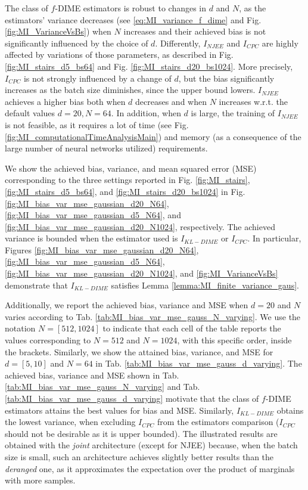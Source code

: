 The class of $f$-DIME estimators is robust to changes in $d$ and $N$, as the estimators' variance decreases (see \eqref{eq:MI_variance_f_dime} and Fig. \ref{fig:MI_VarianceVsBs}) when $N$ increases and their achieved bias is not significantly influenced by the choice of $d$. Differently, $I_{NJEE}$ and $I_{CPC}$ are highly affected by variations of those parameters, as described in Fig. \ref{fig:MI_stairs_d5_bs64} and Fig. \ref{fig:MI_stairs_d20_bs1024}. 
More precisely, $I_{CPC}$ is not strongly influenced by a change of $d$, but the bias significantly increases as the batch size diminishes, since the upper bound lowers.
$I_{NJEE}$ achieves a higher bias both when $d$ decreases and when $N$ increases w.r.t. the default values $d=20, N=64$. In addition, when $d$ is large, the training of $I_{NJEE}$ is not feasible, as it requires a lot of time (see Fig. \ref{fig:MI_computationalTimeAnalysisMain}) and memory (as a consequence of the large number of neural networks utilized) requirements.

We show the achieved bias, variance, and mean squared error (MSE) corresponding to the three settings reported in Fig. \ref{fig:MI_stairs}, \ref{fig:MI_stairs_d5_bs64}, and \ref{fig:MI_stairs_d20_bs1024} in Fig. \ref{fig:MI_bias_var_mse_gaussian_d20_N64}, \ref{fig:MI_bias_var_mse_gaussian_d5_N64}, and \ref{fig:MI_bias_var_mse_gaussian_d20_N1024}, respectively. The achieved variance is bounded when the estimator used is $I_{KL-DIME}$ or $I_{CPC}$. In particular, Figures \ref{fig:MI_bias_var_mse_gaussian_d20_N64}, \ref{fig:MI_bias_var_mse_gaussian_d5_N64}, \ref{fig:MI_bias_var_mse_gaussian_d20_N1024}, and \ref{fig:MI_VarianceVsBs} demonstrate that $I_{KL-DIME}$ satisfies Lemma \ref{lemma:MI_finite_variance_gaus}.

Additionally, we report the achieved bias, variance and MSE when $d=20$ and $N$ varies according to Tab. \ref{tab:MI_bias_var_mse_gauss_N_varying}. We use the notation $N = [512, 1024]$ to indicate that each cell of the table reports the values corresponding to $N=512$ and $N=1024$, with this specific order, inside the brackets.
Similarly, we show the attained bias, variance, and MSE for $d=[5, 10]$ and $N=64$ in Tab. \ref{tab:MI_bias_var_mse_gauss_d_varying}.
The achieved bias, variance and MSE shown in Tab. \ref{tab:MI_bias_var_mse_gauss_N_varying} and Tab. \ref{tab:MI_bias_var_mse_gauss_d_varying} motivate that the class of $f$-DIME estimators attains the best values for bias and MSE. Similarly, $I_{KL-DIME}$ obtains the lowest variance, when excluding $I_{CPC}$ from the estimators comparison ($I_{CPC}$ should not be desirable as it is upper bounded).
The illustrated results are obtained with the \textit{joint} architecture (except for NJEE) because, when the batch size is small, such an architecture achieves slightly better results than the \textit{deranged} one, as it approximates the expectation over the product of marginals with more samples. %

